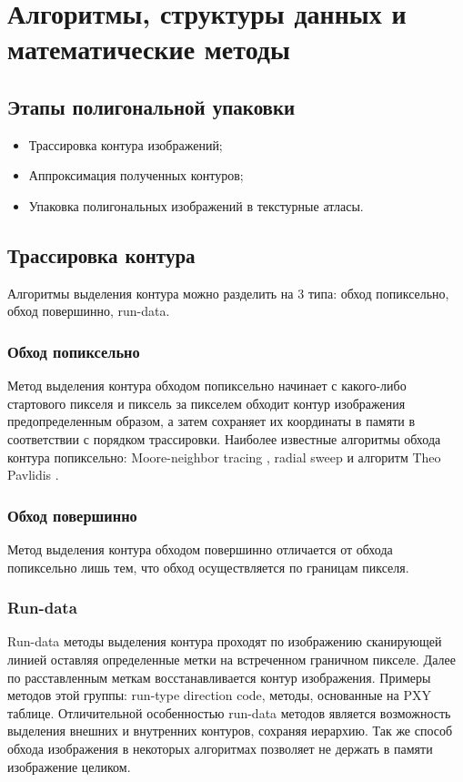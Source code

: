 \documentclass{fefu_thesis/cls/fefu}
\begin{document}
    \section{Алгоритмы, структуры данных и математические методы}
    \subsection{Этапы полигональной упаковки}
    \begin{itemize}
        \item Трассировка контура изображений;
        \item Аппроксимация полученных контуров;
        \item Упаковка полигональных изображений в текстурные атласы.
    \end{itemize}
    \subsection{Трассировка контура}
    Алгоритмы выделения контура можно разделить на 3 типа: обход попиксельно, обход повершинно, run-data.
    \subsubsection{Обход попиксельно}
    Метод выделения контура обходом попиксельно начинает с какого-либо стартового пикселя и пиксель за пикселем обходит контур изображения предопределенным образом, а затем сохраняет их координаты в памяти в соответствии с порядком трассировки. Наиболее известные алгоритмы обхода контура попиксельно: Moore-neighbor tracing \cite{MoorNeighbor}, radial sweep \cite{RadialSweep} и алгоритм Theo Pavlidis \cite{TheoPavlidis}.
    \subsubsection{Обход повершинно}
    Метод выделения контура обходом повершинно отличается от обхода попиксельно лишь тем, что обход осуществляется по границам пикселя.
    \subsubsection{Run-data}
    Run-data методы выделения контура проходят по изображению сканирующей линией оставляя определенные метки на встреченном граничном пикселе. Далее по расставленным меткам восстанавливается контур изображения. Примеры методов этой группы: run-type direction code\cite{Miyatake1997}, методы, основанные на PXY таблице\cite{Shoji}. Отличительной особенностью run-data методов является возможность выделения внешних и внутренних контуров, сохраняя иерархию. Так же способ обхода изображения в некоторых алгоритмах позволяет не держать в памяти изображение целиком.
\end{document}

